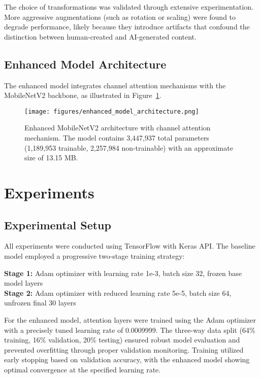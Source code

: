 \documentclass{article}
\begin{document}
The choice of transformations was validated through extensive experimentation. More aggressive augmentations (such as rotation or scaling) were found to degrade performance, likely because they introduce artifacts that confound the distinction between human-created and AI-generated content.


\subsection{Enhanced Model Architecture}

The enhanced model integrates channel attention mechanisms with the MobileNetV2 backbone, as illustrated in Figure~\ref{fig:model_architecture}.

\begin{figure}[H]
\centering
\texttt{[image: figures/enhanced\_model\_architecture.png]}
\caption{Enhanced MobileNetV2 architecture with channel attention mechanism. The model contains 3,447,937 total parameters (1,189,953 trainable, 2,257,984 non-trainable) with an approximate size of 13.15 MB.}
\label{fig:model_architecture}
\end{figure}

\section{Experiments}

\subsection{Experimental Setup}

All experiments were conducted using TensorFlow with Keras API. The baseline model employed a progressive two-stage training strategy:

\textbf{Stage 1:} Adam optimizer with learning rate 1e-3, batch size 32, frozen base model layers\\
\textbf{Stage 2:} Adam optimizer with reduced learning rate 5e-5, batch size 64, unfrozen final 30 layers

For the enhanced model, attention layers were trained using the Adam optimizer with a precisely tuned learning rate of 0.0009999. The three-way data split (64\% training, 16\% validation, 20\% testing) ensured robust model evaluation and prevented overfitting through proper validation monitoring. Training utilized early stopping based on validation accuracy, with the enhanced model showing optimal convergence at the specified learning rate.
\end{document}
